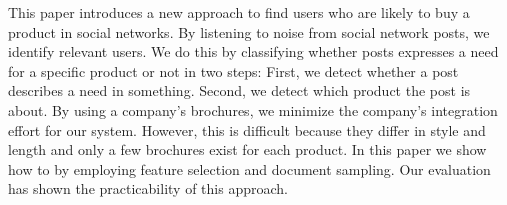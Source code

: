 
This paper introduces a new approach to find users who are likely to buy a product in social networks.
By listening to noise from social network posts, we identify relevant users.
We do this by classifying whether posts expresses a need for a specific product or not in two steps:
First, we detect whether a post describes a need in something.
Second, we detect which product the post is about.
By using a company's brochures, we minimize the company's integration effort for our system.
However, this is difficult because they differ in style and length and only a few brochures exist for each product.
In this paper we show how to by employing feature selection and document sampling.
Our evaluation has shown the practicability of this approach.



